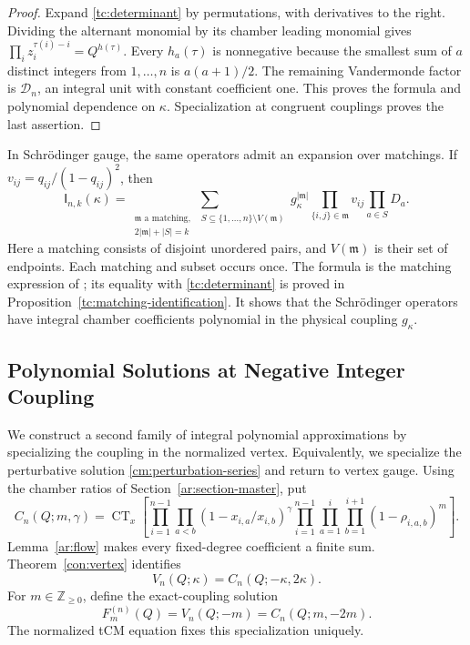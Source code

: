 \documentclass[11pt]{amsart}
\theoremstyle{definition}
\theoremstyle{remark}
\numberwithin{equation}{section}
\newcommand{\Z}{\mathbb Z}
\DeclareMathOperator{\CT}{CT}
\begin{document}
\begin{proof}
Expand \eqref{tc:determinant} by permutations, with derivatives
to the right. Dividing the alternant monomial by its chamber
leading monomial gives
$\prod_i z_i^{\tau(i)-i}=Q^{h(\tau)}$.
Every $h_a(\tau)$ is nonnegative because the smallest sum of
$a$ distinct integers from $1,\ldots,n$ is $a(a+1)/2$.
The remaining Vandermonde factor is $\mathscr D_n$, an integral
unit with constant coefficient one. This proves the formula
and polynomial dependence on $\kappa$. Specialization at
congruent couplings proves the last assertion.
\end{proof}

In Schr\"odinger gauge, the same operators admit an expansion
over matchings. If
$v_{ij}=q_{ij}/(1-q_{ij})^2$, then
\begin{equation}\label{tc:matching-formula}
 \mathsf I_{n,k}(\kappa)
 =\sum_{\substack{\mathfrak m\text{ a matching},\quad
        S\subseteq\{1,\ldots,n\}\setminus V(\mathfrak m)\\
        2|\mathfrak m|+|S|=k}}
 g_\kappa^{|\mathfrak m|}
 \prod_{\{i,j\}\in\mathfrak m}v_{ij}\prod_{a\in S}D_a.
\end{equation}
Here a matching consists of disjoint unordered pairs, and
$V(\mathfrak m)$ is their set of endpoints. Each matching and
subset occurs once. The formula is the matching expression of
\cite{HR15}; its equality with \eqref{tc:determinant} is proved
in Proposition~\ref{tc:matching-identification}. It shows that
the Schr\"odinger operators have integral chamber coefficients
polynomial in the physical coupling $g_\kappa$.

\subsection{Polynomial Solutions at Negative Integer Coupling}
\label{pt:negative-coupling-construction}
We construct a second family of integral polynomial
approximations by specializing the coupling in the normalized
vertex. Equivalently, we specialize the perturbative solution
\eqref{cm:perturbation-series} and return to vertex gauge.
Using the chamber ratios of
Section~\ref{ar:section-master}, put
\begin{equation}\label{pt:two-exponent-period}
 C_n(Q;m,\gamma)=\CT_x\left[
 \prod_{i=1}^{n-1}\prod_{a<b}
       (1-x_{i,a}/x_{i,b})^\gamma
 \prod_{i=1}^{n-1}\prod_{a=1}^i\prod_{b=1}^{i+1}
       (1-\rho_{i,a,b})^m\right].
\end{equation}
Lemma~\ref{ar:flow} makes every fixed-degree coefficient a finite
sum. Theorem~\ref{con:vertex} identifies
\[
 V_n(Q;\kappa)=C_n(Q;-\kappa,2\kappa).
\]
For $m\in\Z_{\geq0}$, define the exact-coupling solution
\begin{equation}\label{pt:negative-integer-polynomial}
 F_m^{(n)}(Q)=V_n(Q;-m)=C_n(Q;m,-2m).
\end{equation}
The normalized tCM equation fixes this specialization uniquely.
\end{document}
